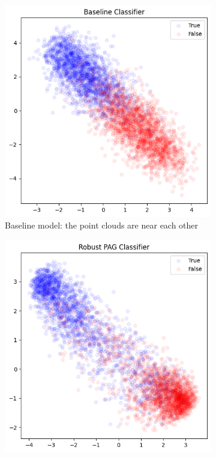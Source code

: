 \documentclass[../thesis.tex]{subfiles}
\begin{document}
\begin{figure}
    \centering
    \begin{subfigure}{0.48\linewidth}
        \centering
        \includegraphics[width=\linewidth]{assets/pag/binary_classifier/pag_ce__baseline_softmax_activations.png}
        \caption{Baseline model: the point clouds are near each other}
    \end{subfigure}
    \hfill
    \begin{subfigure}{0.48\linewidth}
        \centering
        \includegraphics[width=\linewidth]{assets/pag/binary_classifier/pag_ce__robust_softmax_activations.png}

\end{subfigure}
\end{figure}
\end{document}
